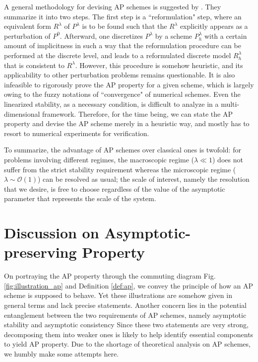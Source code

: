 \documentclass{report}
\begin{document}
 A general methodology for devising AP schemes is suggested by \cite{degond_2012, degond_2017}. They summarize it into two steps. The first step is a ``reformulation" step, where an equivalent form $R^\lambda$ of $P^\lambda$ is to be found such that the $R^\lambda$ explicitly appears as a perturbation of $P^0$. Afterward, one discretizes $P^\lambda$ by a scheme $P^\lambda_h$ with a certain amount of implicitness in such a way that the reformulation procedure can be performed at the discrete level, and leads to a reformulated discrete model $R^\lambda_h$ that is consistent to $R^\lambda$. However, this procedure is somehow heuristic, and its applicability to other perturbation problems remains questionable. It is also infeasible to rigorously prove the AP property for a given scheme, which is largely owing to the fuzzy notations of ``convergence" of numerical schemes. Even the linearized stability, as a necessary condition, is difficult to analyze in a multi-dimensional framework. Therefore, for the time being, we can state the AP property and devise the AP scheme merely in a heuristic way, and mostly has to resort to numerical experiments for verification. 
 
 To summarize, the advantage of AP schemes over classical ones is twofold: for problems involving different regimes, the macroscopic regime ($\lambda \ll 1$) does not suffer from the strict stability requirement whereas the microscopic regime ($\lambda \sim \mathcal{O}(1)$) can be resolved as usual; the scale of interest, namely the resolution that we desire, is free to choose regardless of the value of the asymptotic parameter that represents the scale of the system.  


\chapter{Discussion on Asymptotic-preserving Property}

On portraying the AP property through the commuting diagram Fig. \ref{fig:illustration_ap} and Definition \ref{def:ap}, we convey the principle of how an AP scheme is supposed to behave. Yet these illustrations are somehow given in general terms and lack precise statements. Another concern lies in the potential entanglement between the two requirements of AP schemes, namely asymptotic stability and asymptotic consistency Since these two statements are very strong, decomposing them into weaker ones is likely to help identify essential components to yield AP property. Due to the shortage of theoretical analysis on AP schemes, we humbly make some attempts here.
\end{document}
